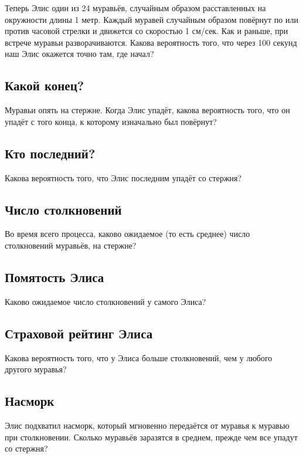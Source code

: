 Теперь Элис один из 24 муравьёв, случайным образом расставленных на окружности длины 1 метр.
Каждый муравей случайным образом повёрнут по или против часовой стрелки и движется со скоростью 1 см/сек.
Как и раньше, при встрече муравьи разворачиваются.
Какова вероятность того, что через 100 секунд наш Элис окажется точно там, где начал?

\subsection*{Какой конец?}

Муравьи опять на стержне.
Когда Элис упадёт, какова вероятность того, что он упадёт с того конца, к которому изначально был повёрнут?

\subsection*{Кто последний?}

Какова вероятность того, что Элис последним упадёт со стержня?

\subsection*{Число столкновений}

Во время всего процесса, каково ожидаемое (то есть среднее) число столкновений муравьёв, на стержне?

\subsection*{Помятость Элиса}

Каково ожидаемое число столкновений у самого Элиса?

\subsection*{Страховой рейтинг Элиса}

Какова вероятность того, что у Элиса больше столкновений, чем у любого другого муравья?

\subsection*{Насморк}

Элис подхватил насморк, который мгновенно передаётся от муравья к муравью при столкновении.
Сколько муравьёв заразятся в среднем, прежде чем все упадут со стержня?

